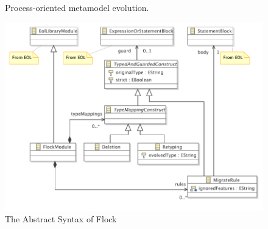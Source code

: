 \begin{landscape}
\begin{figure}[htbp]
	\centering
	\caption{Process-oriented metamodel evolution.}
\label{fig:po_mms}
\end{figure}
\end{landscape}

\begin{landscape}
\begin{figure}
	\centering
		\includegraphics{images/FlockAbstractSyntax.pdf}
	\caption{The Abstract Syntax of Flock}
	\label{fig:flock_abstract_syntax}
\end{figure}
\end{landscape}


